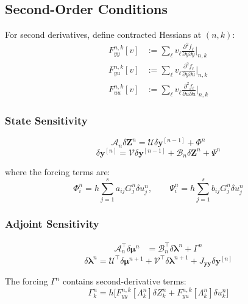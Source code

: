 \documentclass[11pt]{article}
\newcommand{\tp}{^\top}
\newcommand{\pder}[2]{\frac{\partial #1}{\partial #2}}
\newcommand{\Zv}{\mathbf{Z}}
\newcommand{\yv}{\mathbf{y}}
\newcommand{\lv}{\boldsymbol{\lambda}}
\newcommand{\mv}{\boldsymbol{\mu}}
\newcommand{\Av}{\mathcal{A}}
\newcommand{\Bv}{\mathcal{B}}
\newcommand{\Uv}{\mathcal{U}}
\newcommand{\Vv}{\mathcal{V}}
\begin{document}
\subsection{Second-Order Conditions}

For second derivatives, define contracted Hessians at $(n,k)$:
\begin{align}
F_{yy}^{n,k}[v] &:= \sum_\ell v_\ell \pder{^2 f_\ell}{y\partial y}\bigg|_{n,k} \\
F_{yu}^{n,k}[v] &:= \sum_\ell v_\ell \pder{^2 f_\ell}{y\partial u}\bigg|_{n,k} \\
F_{uu}^{n,k}[v] &:= \sum_\ell v_\ell \pder{^2 f_\ell}{u\partial u}\bigg|_{n,k}
\end{align}

\subsubsection{State Sensitivity}

\begin{equation}
\boxed{\Av_n \delta\Zv^n = \Uv\delta\yv^{[n-1]} + \Phi^n}
\end{equation}
\begin{equation}
\boxed{\delta\yv^{[n]} = \Vv\delta\yv^{[n-1]} + \Bv_n\delta\Zv^n + \Psi^n}
\end{equation}

where the forcing terms are:
\begin{equation}
\Phi_i^n = h\sum_{j=1}^s a_{ij} G_j^n \delta u_j^n, \qquad
\Psi_i^n = h\sum_{j=1}^s b_{ij} G_j^n \delta u_j^n
\end{equation}

\subsubsection{Adjoint Sensitivity}

\begin{equation}
\boxed{
\begin{aligned}
\Av_n\tp \delta\mv^n &= \Bv_n\tp \delta\lv^n + \Gamma^n
\end{aligned}
}
\end{equation}
\begin{equation}
\boxed{\delta\lv^n = \Uv\tp\delta\mv^{n+1} + \Vv\tp\delta\lv^{n+1} + J_{\yv\yv}\delta\yv^{[n]}}
\end{equation}

The forcing $\Gamma^n$ contains second-derivative terms:
\begin{equation}
\Gamma_k^n = h\Big[ F_{yy}^{n,k}[\Lambda_k^n] \delta Z_k^n + F_{yu}^{n,k}[\Lambda_k^n] \delta u_k^n \Big]
\end{equation}
\end{document}
